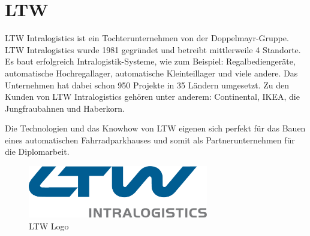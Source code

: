 \section{LTW}
LTW Intralogistics ist ein Tochterunternehmen von der Doppelmayr-Gruppe. LTW Intralogistics wurde 1981 gegründet und betreibt mittlerweile 4 Standorte. Es baut erfolgreich Intralogistik-Systeme, wie zum Beispiel: Regalbediengeräte, automatische Hochregallager, automatische Kleinteillager und viele andere. Das Unternehmen hat dabei schon 950 Projekte in 35 Ländern umgesetzt. Zu den Kunden von LTW Intralogistics gehören unter anderem: Continental, IKEA, die Jungfraubahnen und Haberkorn. 

\bigskip

\noindent Die Technologien und das Knowhow von LTW eigenen sich perfekt für das Bauen eines automatischen Fahrradparkhauses und somit als Partnerunternehmen für die Diplomarbeit.

\bigskip

\begin{figure}[H]
    \centering
    \includegraphics[width=0.7\textwidth]{images/ltwlogo.png}
    \caption{LTW Logo }
    \label{fig:ltwlogo}
\end{figure}